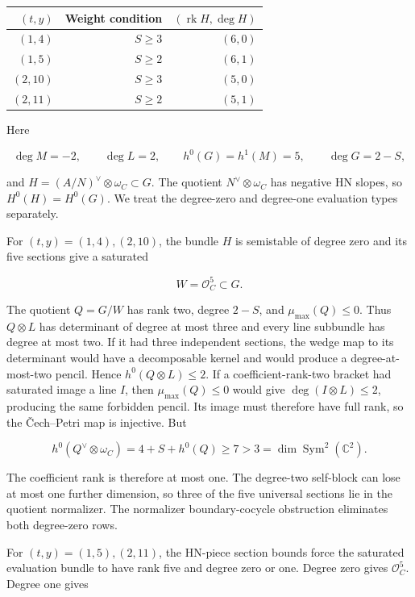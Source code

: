 \documentclass[11pt]{article}
\theoremstyle{definition}
\begin{document}
\begin{longtable}[]{@{}rrr@{}}
\toprule\noalign{}
\((t,y)\) & Weight condition & \((\operatorname{rk}H,\deg H)\) \\
\midrule\noalign{}
\endhead
\bottomrule\noalign{}
\endlastfoot
\((1,4)\) & \(S\ge3\) & \((6,0)\) \\
\((1,5)\) & \(S\ge2\) & \((6,1)\) \\
\((2,10)\) & \(S\ge3\) & \((5,0)\) \\
\((2,11)\) & \(S\ge2\) & \((5,1)\) \\
\end{longtable}

Here

\[\deg M=-2,\qquad \deg L=2,\qquad
h^0(G)=h^1(M)=5,\qquad \deg G=2-S,\]

and \(H=(A/N)^\vee\otimes\omega_C\subset G\). The quotient
\(N^\vee\otimes\omega_C\) has negative HN slopes, so \(H^0(H)=H^0(G)\).
We treat the degree-zero and degree-one evaluation types separately.

For \((t,y)=(1,4),(2,10)\), the bundle \(H\) is semistable of degree
zero and its five sections give a saturated

\[W=\mathcal O_C^5\subset G.\]

The quotient \(Q=G/W\) has rank two, degree \(2-S\), and
\(\mu_{\max}(Q)\le0\). Thus \(Q\otimes L\) has determinant of degree at
most three and every line subbundle has degree at most two. If it had
three independent sections, the wedge map to its determinant would have
a decomposable kernel and would produce a degree-at-most-two pencil.
Hence \(h^0(Q\otimes L)\le2\). If a coefficient-rank-two bracket had
saturated image a line \(I\), then \(\mu_{\max}(Q)\le0\) would give
\(\deg(I\otimes L)\le2\), producing the same forbidden pencil. Its image
must therefore have full rank, so the \v{C}ech--Petri map is injective.
But

\[h^0(Q^\vee\otimes\omega_C)=4+S+h^0(Q)\ge7
>3=\dim\operatorname{Sym}^2(\mathbb C^2).\]

The coefficient rank is therefore at most one. The degree-two self-block
can lose at most one further dimension, so three of the five universal
sections lie in the quotient normalizer. The normalizer boundary-cocycle
obstruction eliminates both degree-zero rows.

For \((t,y)=(1,5),(2,11)\), the HN-piece section bounds force the
saturated evaluation bundle to have rank five and degree zero or one.
Degree zero gives \(\mathcal O_C^5\). Degree one gives
\end{document}
